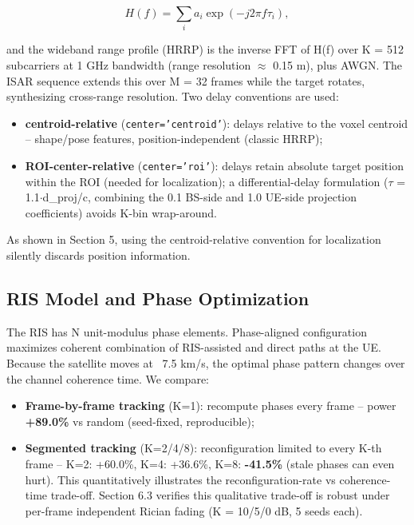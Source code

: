 \documentclass[11pt]{article}
\begin{document}
\begin{equation}
H(f) = \sum_i a_i \exp(-j2\pi f \tau_i),
\end{equation}

and the wideband range profile (HRRP) is the inverse FFT of H(f) over K = 512 subcarriers at 1 GHz bandwidth (range resolution $\approx$ 0.15 m), plus AWGN. The ISAR sequence extends this over M = 32 frames while the target rotates, synthesizing cross-range resolution. Two delay conventions are used:

\begin{itemize}
\item \textbf{centroid-relative} (\texttt{center='centroid'}): delays relative to the voxel centroid -- shape/pose features, position-independent (classic HRRP);
\item \textbf{ROI-center-relative} (\texttt{center='roi'}): delays retain absolute target position within the ROI (needed for localization); a differential-delay formulation ($\tau$ = 1.1$\cdot$d\_proj/c, combining the 0.1 BS-side and 1.0 UE-side projection coefficients) avoids K-bin wrap-around.
\end{itemize}

As shown in Section 5, using the centroid-relative convention for localization silently discards position information.

\subsection{RIS Model and Phase Optimization}

The RIS has N unit-modulus phase elements. Phase-aligned configuration maximizes coherent combination of RIS-assisted and direct paths at the UE. Because the satellite moves at ~7.5 km/s, the optimal phase pattern changes over the channel coherence time. We compare:

\begin{itemize}
\item \textbf{Frame-by-frame tracking} (K=1): recompute phases every frame -- power \textbf{+89.0\%} vs random (seed-fixed, reproducible);
\item \textbf{Segmented tracking} (K=2/4/8): reconfiguration limited to every K-th frame -- K=2: +60.0\%, K=4: +36.6\%, K=8: \textbf{-41.5\%} (stale phases can even hurt). This quantitatively illustrates the reconfiguration-rate vs coherence-time trade-off. Section 6.3 verifies this qualitative trade-off is robust under per-frame independent Rician fading (K = 10/5/0 dB, 5 seeds each).
\end{itemize}
\end{document}
